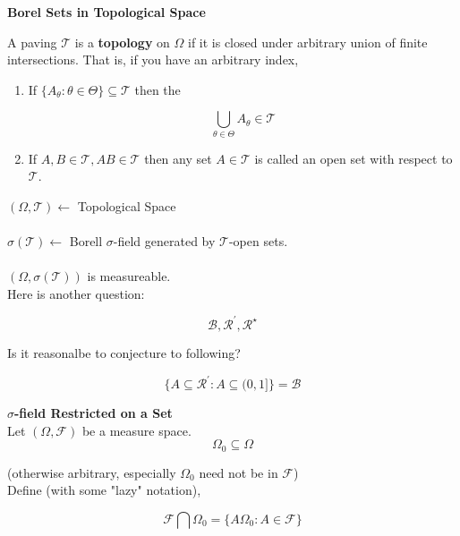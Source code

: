 \documentclass[11pt,fleqn]{book} %
\begin{document}
\textbf{Borel Sets in Topological Space}\\

\begin{definition}[Topology]
	A paving $\mathcal{T}$ is a \textbf{topology} on $\Omega$ if it is closed under arbitrary union of finite intersections. That is, if you have an arbitrary index, 

	\begin{enumerate}
		\item If $\{A_\theta: \theta \in \Theta \} \subseteq \mathcal{T}$ then the

		$$\bigcup_{\theta \in \Theta} A_\theta \in \mathcal{T} $$

		\item If $A, B \in \mathcal{T}, AB \in \mathcal{T}$ then any set $A \in \mathcal{T}$ is called an open set with respect to $\mathcal{T}$.
	\end{enumerate}
	
\end{definition}


$(\Omega, \mathcal{T}) \leftarrow$ Topological Space\\
\\
$\sigma(\mathcal{T}) \leftarrow$ Borell $\sigma$-field generated by $\mathcal{T}$-open sets.\\
\\

$(\Omega, \sigma(\mathcal{T})) $ is measureable. \\

Here is another question: 

	$$\mathcal{B}, \mathcal{R}^\prime, \mathcal{R}^\star$$

	Is it reasonalbe to conjecture to following?

	$$\{A \subseteq \mathcal{R}^\prime: A \subseteq (0,1] \} = \mathcal{B} $$


\textbf{$\sigma$-field Restricted on a Set}\\

	Let $(\Omega, \mathcal{F})$ be a measure space.\\

	$$\Omega_0 \subseteq \Omega $$

	(otherwise arbitrary, especially $\Omega_0$ need not be in $\mathcal{F}$)\\

	Define (with some "lazy" notation),

			$$\mathcal{F} \bigcap \Omega_0 = \{A\Omega_0: A\in \mathcal {F} \} $$
\end{document}

